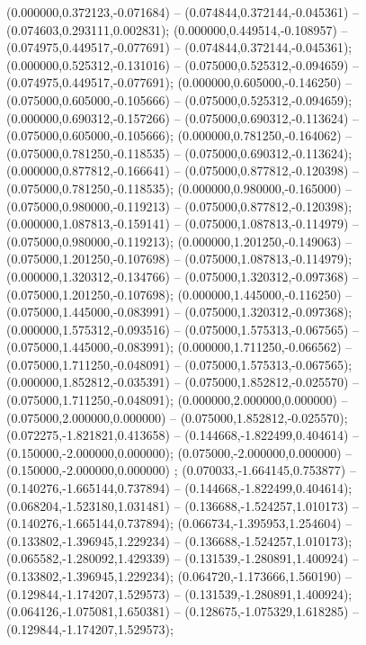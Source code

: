  (0.000000,0.372123,-0.071684) -- (0.074844,0.372144,-0.045361) -- (0.074603,0.293111,0.002831);
 (0.000000,0.449514,-0.108957) -- (0.074975,0.449517,-0.077691) -- (0.074844,0.372144,-0.045361);
 (0.000000,0.525312,-0.131016) -- (0.075000,0.525312,-0.094659) -- (0.074975,0.449517,-0.077691);
 (0.000000,0.605000,-0.146250) -- (0.075000,0.605000,-0.105666) -- (0.075000,0.525312,-0.094659);
 (0.000000,0.690312,-0.157266) -- (0.075000,0.690312,-0.113624) -- (0.075000,0.605000,-0.105666);
 (0.000000,0.781250,-0.164062) -- (0.075000,0.781250,-0.118535) -- (0.075000,0.690312,-0.113624);
 (0.000000,0.877812,-0.166641) -- (0.075000,0.877812,-0.120398) -- (0.075000,0.781250,-0.118535);
 (0.000000,0.980000,-0.165000) -- (0.075000,0.980000,-0.119213) -- (0.075000,0.877812,-0.120398);
 (0.000000,1.087813,-0.159141) -- (0.075000,1.087813,-0.114979) -- (0.075000,0.980000,-0.119213);
 (0.000000,1.201250,-0.149063) -- (0.075000,1.201250,-0.107698) -- (0.075000,1.087813,-0.114979);
 (0.000000,1.320312,-0.134766) -- (0.075000,1.320312,-0.097368) -- (0.075000,1.201250,-0.107698);
 (0.000000,1.445000,-0.116250) -- (0.075000,1.445000,-0.083991) -- (0.075000,1.320312,-0.097368);
 (0.000000,1.575312,-0.093516) -- (0.075000,1.575313,-0.067565) -- (0.075000,1.445000,-0.083991);
 (0.000000,1.711250,-0.066562) -- (0.075000,1.711250,-0.048091) -- (0.075000,1.575313,-0.067565);
 (0.000000,1.852812,-0.035391) -- (0.075000,1.852812,-0.025570) -- (0.075000,1.711250,-0.048091);
 (0.000000,2.000000,0.000000) -- (0.075000,2.000000,0.000000) -- (0.075000,1.852812,-0.025570);
 (0.072275,-1.821821,0.413658) -- (0.144668,-1.822499,0.404614) -- (0.150000,-2.000000,0.000000);
 (0.075000,-2.000000,0.000000) -- (0.150000,-2.000000,0.000000) ;
 (0.070033,-1.664145,0.753877) -- (0.140276,-1.665144,0.737894) -- (0.144668,-1.822499,0.404614);
 (0.068204,-1.523180,1.031481) -- (0.136688,-1.524257,1.010173) -- (0.140276,-1.665144,0.737894);
 (0.066734,-1.395953,1.254604) -- (0.133802,-1.396945,1.229234) -- (0.136688,-1.524257,1.010173);
 (0.065582,-1.280092,1.429339) -- (0.131539,-1.280891,1.400924) -- (0.133802,-1.396945,1.229234);
 (0.064720,-1.173666,1.560190) -- (0.129844,-1.174207,1.529573) -- (0.131539,-1.280891,1.400924);
 (0.064126,-1.075081,1.650381) -- (0.128675,-1.075329,1.618285) -- (0.129844,-1.174207,1.529573);
